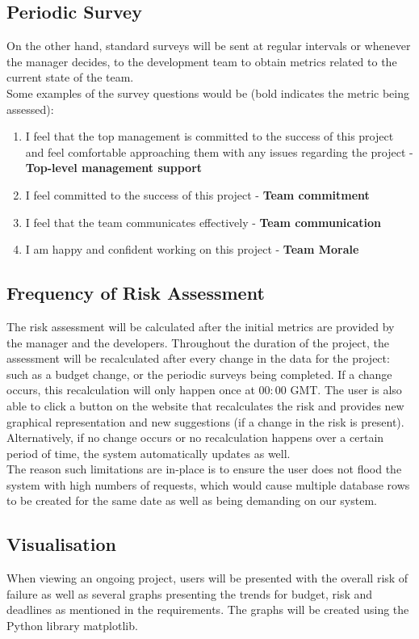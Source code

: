 \documentclass[a4paper]{article}
\theoremstyle{plain}
\theoremstyle{definition}
\theoremstyle{remark}
\begin{document}
\subsection*{Periodic Survey}
On the other hand, standard surveys will be sent at regular intervals or whenever the manager decides, to the development team to obtain metrics related to the current state of the team. \\

\noindent Some examples of the survey questions would be (bold indicates the metric being assessed):
\begin{enumerate}
	\item I feel that the top management is committed to the success of this project and feel comfortable approaching them with any issues regarding the project - \textbf{Top-level management support}
	\item I feel committed to the success of this project - \textbf{Team commitment}
	\item I feel that the team communicates effectively - \textbf{Team communication}
	\item I am happy and confident working on this project - \textbf{Team Morale}
\end{enumerate}
\subsection*{Frequency of Risk Assessment}
The risk assessment will be calculated after the initial metrics are provided by the manager and the developers. Throughout the duration of the project, the assessment will be recalculated after every change in the data for the project: such as a budget change, or the periodic surveys being completed. If a change occurs, this recalculation will only happen once at $00:00$ GMT. The user is also able to click a button on the website that recalculates the risk and provides new graphical representation and new suggestions (if a change in the risk is present). Alternatively, if no change occurs or no recalculation happens over a certain period of time, the system automatically updates as well. \\

\noindent The reason such limitations are in-place is to ensure the user does not flood the system with high numbers of requests, which would cause multiple database rows to be created for the same date as well as being demanding on our system. 
\subsection*{Visualisation}
\noindent When viewing an ongoing project, users will be presented with the overall risk of failure as well as several graphs presenting the trends for budget, risk and deadlines as mentioned in the requirements. The graphs will be created using the Python library matplotlib.\\
\end{document}
